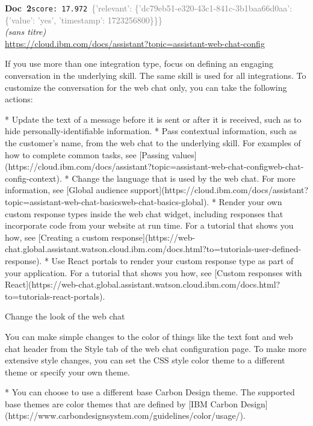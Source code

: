 \documentclass[a4paper,11pt]{article}
\begin{document}
\begin{docenv}
{\footnotesize\textcolor{doccolor}{\textbf{Doc~2}}}\hfill{\tiny\texttt{score:~17.972}}\ {\tiny\textcolor{gray}{\{'relevant': \{'dc79eb51-e320-43c1-841c-3b1baa66d0aa': \{'value': 'yes', 'timestamp': 1723256800\}\}\}}}\\[3pt]
{\small\textit{(sans titre)}}\\[2pt]
{\tiny\url{https://cloud.ibm.com/docs/assistant?topic=assistant-web-chat-config}}\\[4pt]
{\footnotesize 
If you use more than one integration type, focus on defining an engaging conversation in the underlying skill. The same skill is used for all integrations. To customize the conversation for the web chat only, you can take the following actions:



* Update the text of a message before it is sent or after it is received, such as to hide personally-identifiable information.
* Pass contextual information, such as the customer's name, from the web chat to the underlying skill. For examples of how to complete common tasks, see [Passing values](https://cloud.ibm.com/docs/assistant?topic=assistant-web-chat-configweb-chat-config-context).
* Change the language that is used by the web chat. For more information, see [Global audience support](https://cloud.ibm.com/docs/assistant?topic=assistant-web-chat-basicsweb-chat-basics-global).
* Render your own custom response types inside the web chat widget, including responses that incorporate code from your website at run time. For a tutorial that shows you how, see [Creating a custom response](https://web-chat.global.assistant.watson.cloud.ibm.com/docs.html?to=tutorials-user-defined-response).
* Use React portals to render your custom response type as part of your application. For a tutorial that shows you how, see [Custom responses with React](https://web-chat.global.assistant.watson.cloud.ibm.com/docs.html?to=tutorials-react-portals).







 Change the look of the web chat 

You can make simple changes to the color of things like the text font and web chat header from the Style tab of the web chat configuration page. To make more extensive style changes, you can set the CSS style color theme to a different theme or specify your own theme.



* You can choose to use a different base Carbon Design theme. The supported base themes are color themes that are defined by [IBM Carbon Design](https://www.carbondesignsystem.com/guidelines/color/usage/).}
\end{docenv}
\end{document}

